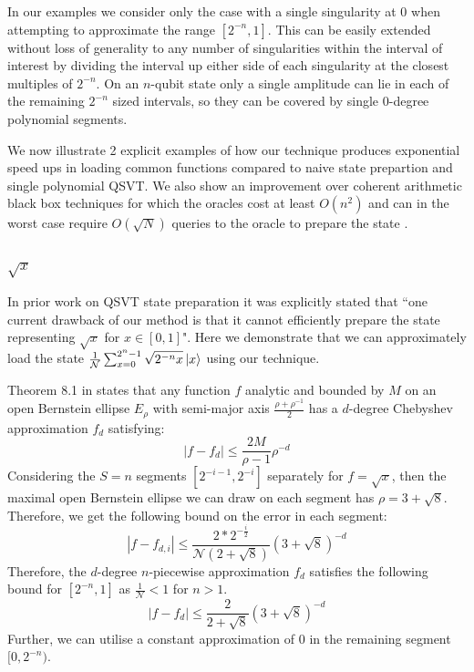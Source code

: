 \documentclass[aps,prx,twocolumn,floatfix,10pt,amssymb,amsfont,amsmath,superscriptaddress,float,nofootinbib,longbibliography,nobalancelastpage]{revtex4-2}
\theoremstyle{empty}
\begin{document}
In our examples we consider only the case with a single singularity at $0$ when attempting to approximate the range $[2^{-n},1]$. This can be easily extended without loss of generality to any number of singularities within the interval of interest by dividing the interval up either side of each singularity at the closest multiples of $2^{-n}$. On an $n$-qubit state only a single amplitude can lie in each of the remaining $2^{-n}$ sized intervals, so they can be covered by single 0-degree polynomial segments.

We now illustrate 2 explicit examples of how our technique produces exponential speed ups in loading common functions compared to naive state prepartion and single polynomial QSVT. We also show an improvement over coherent arithmetic black box techniques for which the oracles cost at least $O(n^2)$ \cite{Haner:2018yea} and can in the worst case require $O(\sqrt{N})$ queries to the oracle to prepare the state \cite{Bausch:2020wxy}.


\subsubsection{$\sqrt{x}$}
\label{section:sqrt}
In prior work \cite{mcardleQuantumStatePreparation2022} on QSVT state preparation it was explicitly stated that ``one current drawback of our method is that it cannot efficiently prepare the state representing $\sqrt{x}$ for $x \in [0, 1]$". Here we demonstrate that we can approximately load the state $\frac{1}{\mathcal{N}} \sum_{x=0}^{2^n-1} \sqrt{2^{-n}x} \ket{x}$ using our technique.

Theorem 8.1 in \cite{Trefethen} states that any function $f$ analytic and bounded by $M$ on an open Bernstein ellipse $E_{\rho}$ with semi-major axis $\frac{\rho+\rho^{-1}}{2}$ has a $d$-degree Chebyshev approximation $f_d$ satisfying:
\begin{equation}
    |f - f_d| \leq \frac{2M}{\rho - 1}\rho^{-d}
\end{equation}
Considering the $S=n$ segments $[2^{-i-1}, 2^{-i}]$ separately for $f=\sqrt{x}$, then the maximal open Bernstein ellipse we can draw on each segment has $\rho = 3+\sqrt{8}$. Therefore, we get the following bound on the error in each segment:
\begin{equation}
    |f - f_{d,i}| \leq \frac{2*2^{-\frac{i}{2}}}{\mathcal{N}(2+ \sqrt{8})} (3+\sqrt{8})^{-d}
\end{equation}
Therefore, the $d$-degree $n$-piecewise approximation $f_{d}$ satisfies the following bound for $[2^{-n}, 1]$ as $\frac{1}{\mathcal{N}} < 1$ for $n>1$.
\begin{equation}
    |f - f_{d}| \leq \frac{2}{2+ \sqrt{8}} (3+\sqrt{8})^{-d}
\end{equation}
Further, we can utilise a constant approximation of $0$ in the remaining segment $[0, 2^{-n})$. 
\end{document}

